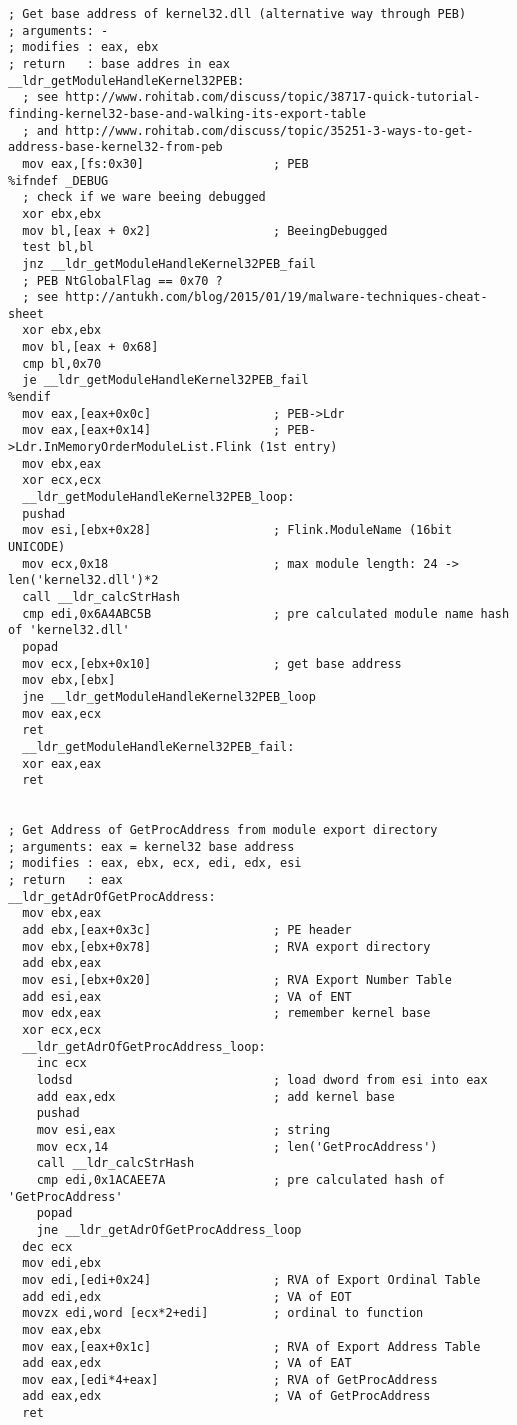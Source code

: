 \documentclass{article}
\begin{document}
\begin{lstlisting}[frame=single]
; Get base address of kernel32.dll (alternative way through PEB)
; arguments: -
; modifies : eax, ebx
; return   : base addres in eax
__ldr_getModuleHandleKernel32PEB:
  ; see http://www.rohitab.com/discuss/topic/38717-quick-tutorial-finding-kernel32-base-and-walking-its-export-table
  ; and http://www.rohitab.com/discuss/topic/35251-3-ways-to-get-address-base-kernel32-from-peb
  mov eax,[fs:0x30]                  ; PEB
%ifndef _DEBUG
  ; check if we ware beeing debugged
  xor ebx,ebx
  mov bl,[eax + 0x2]                 ; BeeingDebugged
  test bl,bl
  jnz __ldr_getModuleHandleKernel32PEB_fail
  ; PEB NtGlobalFlag == 0x70 ?
  ; see http://antukh.com/blog/2015/01/19/malware-techniques-cheat-sheet
  xor ebx,ebx
  mov bl,[eax + 0x68]
  cmp bl,0x70
  je __ldr_getModuleHandleKernel32PEB_fail
%endif
  mov eax,[eax+0x0c]                 ; PEB->Ldr
  mov eax,[eax+0x14]                 ; PEB->Ldr.InMemoryOrderModuleList.Flink (1st entry)
  mov ebx,eax
  xor ecx,ecx
  __ldr_getModuleHandleKernel32PEB_loop:
  pushad
  mov esi,[ebx+0x28]                 ; Flink.ModuleName (16bit UNICODE)
  mov ecx,0x18                       ; max module length: 24 -> len('kernel32.dll')*2
  call __ldr_calcStrHash
  cmp edi,0x6A4ABC5B                 ; pre calculated module name hash of 'kernel32.dll'
  popad
  mov ecx,[ebx+0x10]                 ; get base address
  mov ebx,[ebx]
  jne __ldr_getModuleHandleKernel32PEB_loop
  mov eax,ecx
  ret
  __ldr_getModuleHandleKernel32PEB_fail:
  xor eax,eax
  ret


; Get Address of GetProcAddress from module export directory
; arguments: eax = kernel32 base address
; modifies : eax, ebx, ecx, edi, edx, esi
; return   : eax
__ldr_getAdrOfGetProcAddress:
  mov ebx,eax
  add ebx,[eax+0x3c]                 ; PE header
  mov ebx,[ebx+0x78]                 ; RVA export directory
  add ebx,eax
  mov esi,[ebx+0x20]                 ; RVA Export Number Table
  add esi,eax                        ; VA of ENT
  mov edx,eax                        ; remember kernel base
  xor ecx,ecx
  __ldr_getAdrOfGetProcAddress_loop:
    inc ecx
    lodsd                            ; load dword from esi into eax
    add eax,edx                      ; add kernel base
    pushad
    mov esi,eax                      ; string
    mov ecx,14                       ; len('GetProcAddress')
    call __ldr_calcStrHash
    cmp edi,0x1ACAEE7A               ; pre calculated hash of 'GetProcAddress'
    popad
    jne __ldr_getAdrOfGetProcAddress_loop
  dec ecx
  mov edi,ebx
  mov edi,[edi+0x24]                 ; RVA of Export Ordinal Table
  add edi,edx                        ; VA of EOT
  movzx edi,word [ecx*2+edi]         ; ordinal to function
  mov eax,ebx
  mov eax,[eax+0x1c]                 ; RVA of Export Address Table
  add eax,edx                        ; VA of EAT
  mov eax,[edi*4+eax]                ; RVA of GetProcAddress
  add eax,edx                        ; VA of GetProcAddress
  ret



\end{lstlisting}
\end{document}
